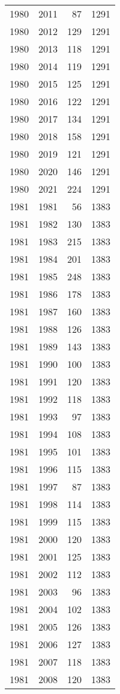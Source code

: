\documentclass[
  11pt,
  letterpaper,
  DIV=11,
  numbers=noendperiod,
  twoside]{scrartcl}
\begin{document}
\begin{longtable}[]{@{}rrrr@{}}
1980 & 2011 & 87 & 1291 \\
1980 & 2012 & 129 & 1291 \\
1980 & 2013 & 118 & 1291 \\
1980 & 2014 & 119 & 1291 \\
1980 & 2015 & 125 & 1291 \\
1980 & 2016 & 122 & 1291 \\
1980 & 2017 & 134 & 1291 \\
1980 & 2018 & 158 & 1291 \\
1980 & 2019 & 121 & 1291 \\
1980 & 2020 & 146 & 1291 \\
1980 & 2021 & 224 & 1291 \\
1981 & 1981 & 56 & 1383 \\
1981 & 1982 & 130 & 1383 \\
1981 & 1983 & 215 & 1383 \\
1981 & 1984 & 201 & 1383 \\
1981 & 1985 & 248 & 1383 \\
1981 & 1986 & 178 & 1383 \\
1981 & 1987 & 160 & 1383 \\
1981 & 1988 & 126 & 1383 \\
1981 & 1989 & 143 & 1383 \\
1981 & 1990 & 100 & 1383 \\
1981 & 1991 & 120 & 1383 \\
1981 & 1992 & 118 & 1383 \\
1981 & 1993 & 97 & 1383 \\
1981 & 1994 & 108 & 1383 \\
1981 & 1995 & 101 & 1383 \\
1981 & 1996 & 115 & 1383 \\
1981 & 1997 & 87 & 1383 \\
1981 & 1998 & 114 & 1383 \\
1981 & 1999 & 115 & 1383 \\
1981 & 2000 & 120 & 1383 \\
1981 & 2001 & 125 & 1383 \\
1981 & 2002 & 112 & 1383 \\
1981 & 2003 & 96 & 1383 \\
1981 & 2004 & 102 & 1383 \\
1981 & 2005 & 126 & 1383 \\
1981 & 2006 & 127 & 1383 \\
1981 & 2007 & 118 & 1383 \\
1981 & 2008 & 120 & 1383 \\

\end{longtable}
\end{document}
